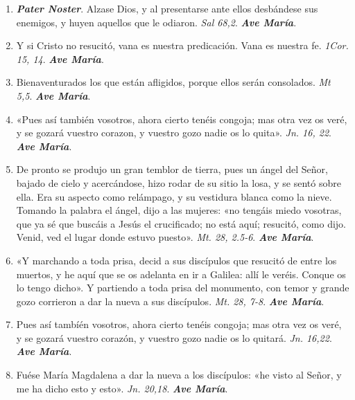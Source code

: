 \documentclass[../../devocionario.tex]{subfiles}
\begin{document}
    \begin{enumerate}
    
        \item \textbf{\emph{Pater Noster}}. Alzase Dios, y al presentarse ante ellos desbándese sus enemigos, y huyen aquellos que le odiaron. \emph{Sal 68,2}. \textbf{\emph{Ave María}}.
        
        \item Y si Cristo no resucitó, vana es nuestra predicación. Vana es nuestra fe. \emph{1Cor. 15, 14}. \textbf{\emph{Ave María}}.

        \item Bienaventurados los que están afligidos, porque ellos serán consolados. \emph{Mt 5,5}. \textbf{\emph{Ave María}}.

        \item «Pues así también vosotros, ahora cierto tenéis congoja; mas otra vez os veré, y se gozará vuestro corazon, y vuestro gozo nadie os lo quita». \emph{Jn. 16, 22}. \textbf{\emph{Ave María}}.

        \item De pronto se produjo un gran temblor de tierra, pues un ángel del Señor, bajado de cielo y acercándose, hizo rodar de su sitio la losa, y se sentó sobre ella. 
            Era su aspecto como relámpago, y su vestidura blanca como la nieve. Tomando la palabra el ángel, dijo a las mujeres: «no tengáis miedo vosotras, que ya sé que buscáis 
            a Jesús el crucificado; no está aquí; resucitó, como dijo. Venid, ved el lugar donde estuvo puesto». \emph{Mt. 28, 2.5-6}. \textbf{\emph{Ave María}}.

        \item «Y marchando a toda prisa, decid a sus discípulos que resucitó de entre los muertos, y he aquí que se os adelanta en ir a Galilea: allí le veréis. Conque os lo tengo dicho». 
            Y partiendo a toda prisa del monumento, con temor y grande gozo corrieron a dar la nueva a sus discípulos. \emph{Mt. 28, 7-8}. \textbf{\emph{Ave María}}.

        \item Pues así tambíén vosotros, ahora cierto tenéis congoja; mas otra vez os veré, y se gozará vuestro corazón, y vuestro gozo nadie os lo quitará. \emph{Jn. 16,22}. \textbf{\emph{Ave María}}.

        \item Fuése María Magdalena a dar la nueva a los discípulos: «he visto al Señor, y me ha dicho esto y esto». \emph{Jn. 20,18}. \textbf{\emph{Ave María}}.
        

\end{enumerate}
\end{document}
